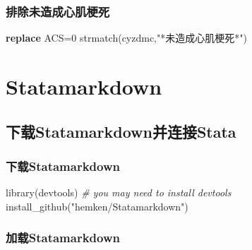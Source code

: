 \documentclass[
]{book}
\newenvironment{Shaded}{\begin{snugshade}}{\end{snugshade}}
\newcommand{\AttributeTok}[1]{\textcolor[rgb]{0.77,0.63,0.00}{#1}}
\newcommand{\CommentTok}[1]{\textcolor[rgb]{0.56,0.35,0.01}{\textit{#1}}}
\newcommand{\FunctionTok}[1]{\textcolor[rgb]{0.00,0.00,0.00}{#1}}
\newcommand{\KeywordTok}[1]{\textcolor[rgb]{0.13,0.29,0.53}{\textbf{#1}}}
\newcommand{\NormalTok}[1]{#1}
\newcommand{\OtherTok}[1]{\textcolor[rgb]{0.56,0.35,0.01}{#1}}
\newcommand{\SpecialCharTok}[1]{\textcolor[rgb]{0.00,0.00,0.00}{#1}}
\newcommand{\StringTok}[1]{\textcolor[rgb]{0.31,0.60,0.02}{#1}}
\begin{document}
\hypertarget{ux6392ux9664ux672aux9020ux6210ux5fc3ux808cux6897ux6b7b}{%
\subsection{排除未造成心肌梗死}\label{ux6392ux9664ux672aux9020ux6210ux5fc3ux808cux6897ux6b7b}}

\begin{Shaded}
\begin{Highlighting}[]
\KeywordTok{replace}\NormalTok{ ACS=0 }\FunctionTok{strmatch}\NormalTok{(cyzdmc,}\StringTok{"*未造成心肌梗死*"}\NormalTok{)}
\end{Highlighting}
\end{Shaded}

\hypertarget{statamarkdown}{%
\chapter{Statamarkdown}\label{statamarkdown}}

\hypertarget{ux4e0bux8f7dstatamarkdownux5e76ux8fdeux63a5stata}{%
\section{下载Statamarkdown并连接Stata}\label{ux4e0bux8f7dstatamarkdownux5e76ux8fdeux63a5stata}}

\hypertarget{ux4e0bux8f7dstatamarkdown}{%
\subsection{下载Statamarkdown}\label{ux4e0bux8f7dstatamarkdown}}

\begin{Shaded}
\begin{Highlighting}[]
\FunctionTok{library}\NormalTok{(devtools) }\CommentTok{\# you may need to install devtools}
\FunctionTok{install\_github}\NormalTok{(}\StringTok{"hemken/Statamarkdown"}\NormalTok{)}
\end{Highlighting}
\end{Shaded}

\hypertarget{ux52a0ux8f7dstatamarkdown}{%
\subsection{加载Statamarkdown}\label{ux52a0ux8f7dstatamarkdown}}

\begin{Shaded}
\end{Shaded}
\end{document}
